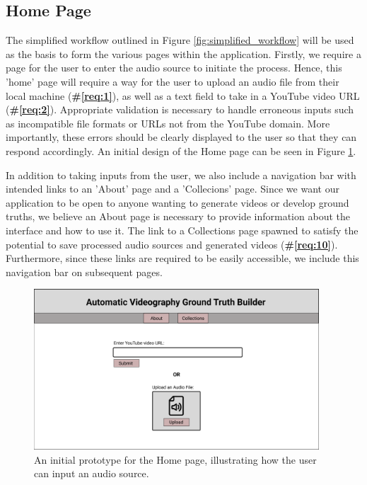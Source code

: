 \documentclass{l4proj}
\begin{document}
\subsection{Home Page}
The simplified workflow outlined in Figure \ref{fig:simplified_workflow} will be used as the basis to form the various pages within the application. Firstly, we require a page for the user to enter the audio source to initiate the process. Hence, this 'home' page will require a way for the user to upload an audio file from their local machine (\textbf{\#\ref{req:1}}), as well as a text field to take in a YouTube video URL (\textbf{\#\ref{req:2}}). Appropriate validation is necessary to handle erroneous inputs such as incompatible file formats or URLs not from the YouTube domain. More importantly, these errors should be clearly displayed to the user so that they can respond accordingly. An initial design of the Home page can be seen in Figure \ref{fig:home_page}. 

In addition to taking inputs from the user, we also include a navigation bar with intended links to an 'About' page and a 'Collecions' page. Since we want our application to be open to anyone wanting to generate videos or develop ground truths, we believe an About page is necessary to provide information about the interface and how to use it. The link to a Collections page spawned to satisfy the potential to save processed audio sources and generated videos (\textbf{\#\ref{req:10}}). Furthermore, since these links are required to be easily accessible, we include this navigation bar on subsequent pages.

\begin{figure}
    \centering
    \includegraphics[width=0.95\textwidth]{figures/home_page.pdf}
    \caption{An initial prototype for the Home page, illustrating how the user can input an audio source.}
    \label{fig:home_page}
\end{figure}
\end{document}
